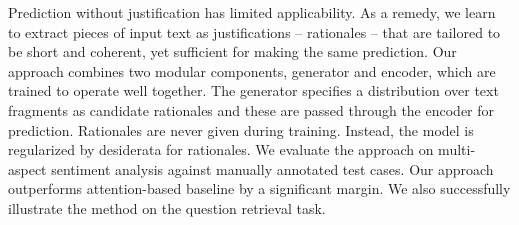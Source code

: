 Prediction without justification has limited applicability. As a remedy, we learn to extract pieces of input text as justifications -- rationales -- that are tailored to be short and coherent, yet sufficient for making the same prediction. Our approach combines two modular components, generator and encoder, which are trained to operate well together. The generator specifies a distribution over text fragments as candidate rationales and these are passed through the encoder for prediction. Rationales are never given during training. Instead, the model is regularized by desiderata for rationales. We evaluate the approach on multi-aspect sentiment analysis against manually annotated test cases. Our approach outperforms attention-based baseline by a significant margin. We also successfully illustrate the method on the question retrieval task.
